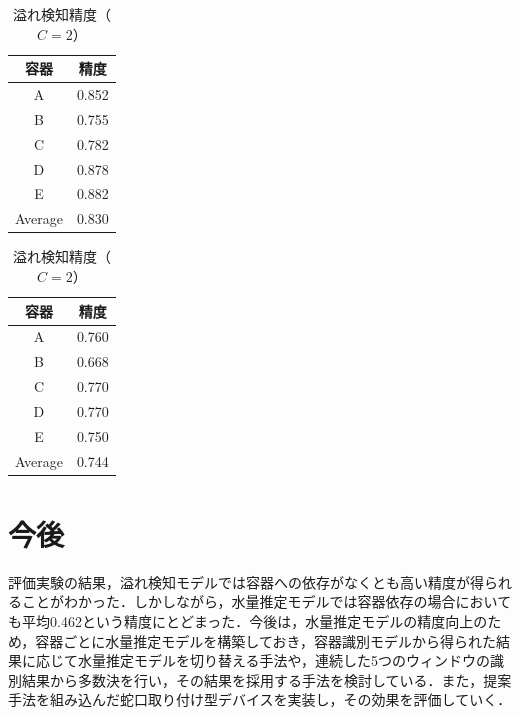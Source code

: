 \documentclass[submit,techrep,noauthor]{ipsj}
\begin{document}
\begin{table}[!t]
  \small
  \centering
  \caption{溢れ検知精度（$C=2$）}
  \begin{minipage}[t]{0.45\linewidth}
    \centering
    \begin{tabular}{c|c} \hline\hline
    容器 & 精度 \\ \hline
    A & 0.852 \\
    B & 0.755 \\
    C & 0.782 \\
    D & 0.878 \\
    E & 0.882 \\ \hline
    Average & 0.830 \\ \hline
    \end{tabular}
    \label{tab:result_2_dependent}
  \end{minipage}
  \begin{minipage}[t]{0.45\linewidth}
    \centering
    \begin{tabular}{c|c} \hline\hline
    容器 & 精度 \\ \hline
    A & 0.760 \\
    B & 0.668 \\
    C & 0.770 \\
    D & 0.770 \\
    E & 0.750 \\ \hline
    Average & 0.744 \\ \hline
    \end{tabular}
    \label{tab:result_2_independent}
  \end{minipage}
  \label{tab:result_2}
\end{table}



\section{今後}
\label{sec:future_work}
評価実験の結果，溢れ検知モデルでは容器への依存がなくとも高い精度が得られることがわかった．しかしながら，水量推定モデルでは容器依存の場合においても平均0.462という精度にとどまった．今後は，水量推定モデルの精度向上のため，容器ごとに水量推定モデルを構築しておき，容器識別モデルから得られた結果に応じて水量推定モデルを切り替える手法や，連続した5つのウィンドウの識別結果から多数決を行い，その結果を採用する手法を検討している．また，提案手法を組み込んだ蛇口取り付け型デバイスを実装し，その効果を評価していく．
\end{document}
